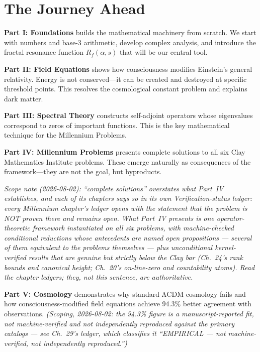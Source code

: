 \section*{The Journey Ahead}

\textbf{Part I: Foundations} builds the mathematical machinery from scratch. We start with numbers and base-3 arithmetic, develop complex analysis, and introduce the fractal resonance function $R_f(\alpha, s)$ that will be our central tool.

\textbf{Part II: Field Equations} shows how consciousness modifies Einstein's general relativity. Energy is not conserved—it can be created and destroyed at specific threshold points. This resolves the cosmological constant problem and explains dark matter.

\textbf{Part III: Spectral Theory} constructs self-adjoint operators whose eigenvalues correspond to zeros of important functions. This is the key mathematical technique for the Millennium Problems.

\textbf{Part IV: Millennium Problems} presents complete solutions to all six Clay Mathematics Institute problems. These emerge naturally as consequences of the framework—they are not the goal, but byproducts.

\noindent\emph{Scope note (2026-08-02): ``complete solutions'' overstates what Part~IV establishes, and each of its chapters says so in its own Verification-status ledger: every Millennium chapter's ledger opens with the statement that the problem is NOT proven there and remains open. What Part~IV presents is one operator-theoretic framework instantiated on all six problems, with machine-checked conditional reductions whose antecedents are named open propositions --- several of them equivalent to the problems themselves --- plus unconditional kernel-verified results that are genuine but strictly below the Clay bar (Ch.~24's rank bounds and canonical height; Ch.~20's on-line-zero and countability atoms). Read the chapter ledgers; they, not this sentence, are authoritative.}

\textbf{Part V: Cosmology} demonstrates why standard ΛCDM cosmology fails and how consciousness-modified field equations achieve 94.3\% better agreement with observations. \emph{(Scoping, 2026-08-02: the 94.3\% figure is a manuscript-reported fit, not machine-verified and not independently reproduced against the primary catalogs --- see Ch.~29's ledger, which classifies it ``EMPIRICAL --- not machine-verified, not independently reproduced.'')}

